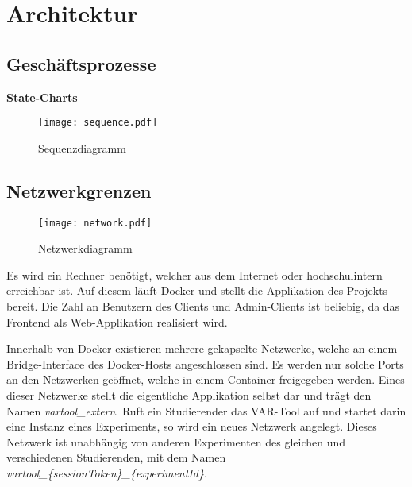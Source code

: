 \section{Architektur}

\subsection{Geschäftsprozesse}
{\bfseries State-Charts}
\begin{landscape}
  \begin{figure}[h]
    \centering
    \texttt{[image: sequence.pdf]}
    \par
    \caption{Sequenzdiagramm}
    \label{fig:sequence}
  \end{figure}
\end{landscape}

\subsection{Netzwerkgrenzen}
  \begin{figure}[h]
    \centering
    \texttt{[image: network.pdf]}
    \caption{Netzwerkdiagramm}
    \label{fig:network}
  \end{figure}
  
Es wird ein Rechner benötigt, welcher aus dem Internet oder hochschulintern erreichbar ist.
  Auf diesem läuft Docker und stellt die Applikation des Projekts bereit.
  Die Zahl an Benutzern des Clients und Admin-Clients ist beliebig, da das Frontend als Web-Applikation realisiert wird.
  \par
  Innerhalb von Docker existieren mehrere gekapselte Netzwerke, welche an einem Bridge-Interface des Docker-Hosts angeschlossen sind.
  Es werden nur solche Ports an den Netzwerken geöffnet, welche in einem Container freigegeben werden.
  Eines dieser Netzwerke stellt die eigentliche Applikation selbst dar und trägt den Namen \textit{vartool\_extern}.
  Ruft ein Studierender das VAR-Tool auf und startet darin eine Instanz eines Experiments, so wird ein neues Netzwerk angelegt.
  Dieses Netzwerk ist unabhängig von anderen Experimenten des gleichen und verschiedenen Studierenden, mit dem Namen \textit{vartool\_\{sessionToken\}\_\{experimentId\}}. 


